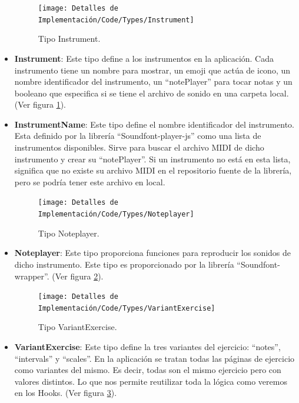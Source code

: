 \documentclass[12pt,twoside,titlepage]{report}
\begin{document}
\begin{itemize}
    \begin{figure}[H]
        \centering
        \texttt{[image: Detalles de Implementación/Code/Types/Instrument]}
        \caption{Tipo Instrument.}
        \label{fig:Instrument}
    \end{figure}

    \item \textbf{Instrument}: Este tipo define a los instrumentos en la aplicación. Cada instrumento tiene un nombre para mostrar, un emoji que actúa de icono, un nombre identificador del instrumento, un ``notePlayer'' para tocar notas y un booleano que especifica si se tiene el archivo de sonido en una carpeta local. (Ver figura \ref{fig:Instrument}).
    \item \textbf{InstrumentName}: Este tipo define el nombre identificador del instrumento. Esta definido por la librería ``Soundfont-player-js'' como una lista de instrumentos disponibles. Sirve para buscar el archivo MIDI de dicho instrumento y crear su ``notePlayer''. Si un instrumento no está en esta lista, significa que no existe su archivo MIDI en el repositorio fuente de la librería, pero se podría tener este archivo en local.
    
    \begin{figure}[H]
        \centering
        \texttt{[image: Detalles de Implementación/Code/Types/Noteplayer]}
        \caption{Tipo Noteplayer.}
        \label{fig:Noteplayer}
    \end{figure}

    \item \textbf{Noteplayer}: Este tipo proporciona funciones para reproducir los sonidos de dicho instrumento. Este tipo es proporcionado por la librería ``Soundfont-wrapper''. (Ver figura \ref{fig:Noteplayer}).

    \begin{figure}[H]
        \centering
        \texttt{[image: Detalles de Implementación/Code/Types/VariantExercise]}
        \caption{Tipo VariantExercise.}
        \label{fig:VariantExercise}
    \end{figure}

    \item \textbf{VariantExercise}: Este tipo define la tres variantes del ejercicio: ``notes'', ``intervals'' y ``scales''. En la aplicación se tratan todas las páginas de ejercicio como variantes del mismo. Es decir, todas son el mismo ejercicio pero con valores distintos. Lo que nos permite reutilizar toda la lógica como veremos en los Hooks.
    (Ver figura \ref{fig:VariantExercise}).


\end{itemize}
\end{document}
